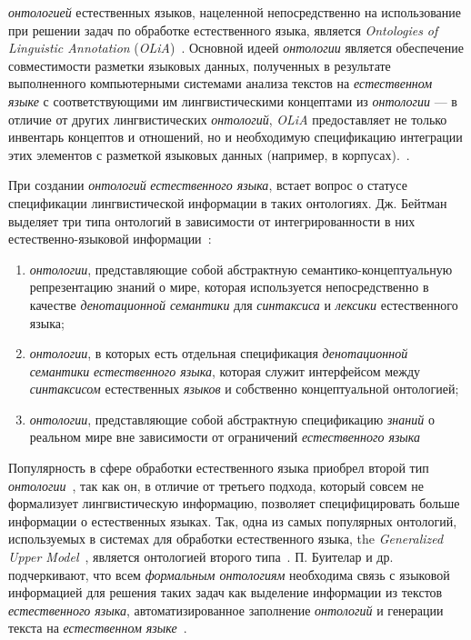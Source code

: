 \textit{онтологией} естественных языков, нацеленной непосредственно на использование при решении задач по обработке естественного языка, является \textit{Ontologies of Linguistic Annotation} (\textit{OLiA})~\cite{Chiarcos2012a}.
Основной идеей \textit{онтологии} является обеспечение совместимости разметки языковых данных, полученных в результате выполненного компьютерными системами анализа текстов на \textit{естественном языке} с соответствующими им лингвистическими концептами из \textit{онтологии} --- в отличие от других лингвистических \textit{онтологий}, \textit{OLiA} предоставляет не только инвентарь концептов и отношений, но и необходимую спецификацию интеграции этих элементов с разметкой языковых данных (например, в корпусах).~\cite[p.~4]{Chiarcos2012a}.

При создании \textit{онтологий} \textit{естественного языка}, встает вопрос о статусе спецификации лингвистической информации в таких онтологиях.
Дж. Бейтман выделяет три типа онтологий в зависимости от интегрированности в них естественно-языковой информации~\cite{Bateman1997}:
\begin{enumerate}
    \item \textit{онтологии}, представляющие собой абстрактную семантико-концептуальную репрезентацию знаний о мире, которая используется непосредственно в качестве \textit{денотационной семантики} для \textit{синтаксиса} и \textit{лексики} естественного языка;
    \item \textit{онтологии}, в которых есть отдельная спецификация \textit{денотационной семантики} \textit{естественного языка}, которая служит интерфейсом между \textit{синтаксисом} естественных \textit{языков} и собственно концептуальной онтологией;
    \item \textit{онтологии}, представляющие собой абстрактную спецификацию \textit{знаний} о реальном мире вне зависимости от ограничений \textit{естественного языка}
\end{enumerate}

Популярность в сфере обработки естественного языка приобрел второй тип \textit{онтологии}~\cite[p.~8]{Bateman1997}, так как он, в отличие от третьего подхода, который совсем не формализует лингвистическую информацию, позволяет специфицировать больше информации о естественных языках.
Так, одна из самых популярных онтологий, используемых в системах для обработки естественного языка, the \textit{Generalized Upper Model}~\cite{Bateman2002}, является онтологией второго типа~\cite{Bateman1997}.
П. Буителар и др. подчеркивают, что всем \textit{формальным онтологиям} необходима связь с языковой информацией для решения таких задач как выделение информации из текстов \textit{естественного языка}, автоматизированное заполнение \textit{онтологий} и генерации текста на \textit{естественном языке}~\cite{Buitelaar2009}.

